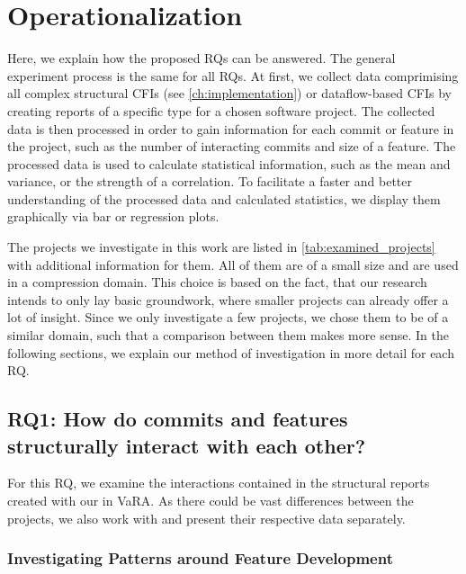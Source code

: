 \section{Operationalization}\label{sec:operationalization}

Here, we explain how the proposed RQs can be answered.
The general experiment process is the same for all RQs.
At first, we collect data comprimising all complex structural CFIs (see \autoref{ch:implementation}) or dataflow-based CFIs by creating reports of a specific type for a chosen software project.
The collected data is then processed in order to gain information for each commit or feature in the project, such as the number of interacting commits and size of a feature.
The processed data is used to calculate statistical information, such as the mean and variance, or the strength of a correlation.
To facilitate a faster and better understanding of the processed data and calculated statistics, we display them graphically via bar or regression plots.

The projects we investigate in this work are listed in \autoref{tab:examined_projects} with additional information for them.
All of them are of a small size and are used in a compression domain.
This choice is based on the fact, that our research intends to only lay basic groundwork, where smaller projects can already offer a lot of insight.
Since we only investigate a few projects, we chose them to be of a similar domain, such that a comparison between them makes more sense.
In the following sections, we explain our method of investigation in more detail for each RQ.

\subsection*{\textbf{RQ1: How do commits and features structurally interact with each other?}}

For this RQ, we examine the interactions contained in the structural reports created with our  in VaRA.
As there could be vast differences between the projects, we also work with and present their respective data separately.

\subsubsection*{Investigating Patterns around Feature Development}

